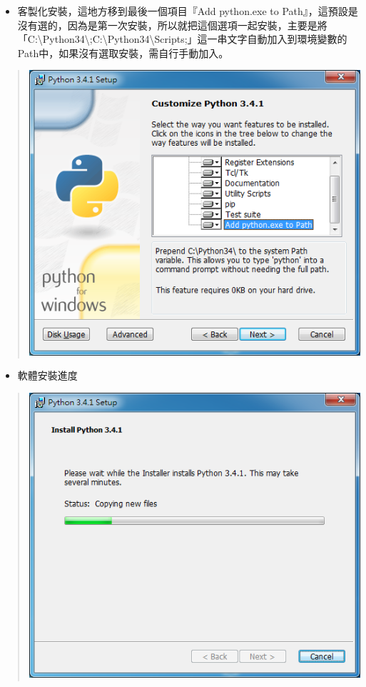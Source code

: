 \documentclass[letterpaper,10pt,english]{sphinxmanual}
\begin{document}
\begin{itemize}
\item {} 
客製化安裝，這地方移到最後一個項目『Add python.exe to Path』，這預設是沒有選的，因為是第一次安裝，所以就把這個選項一起安裝，主要是將「C:\textbackslash{}Python34\textbackslash{};C:\textbackslash{}Python34\textbackslash{}Scripts;」這一串文字自動加入到環境變數的Path中，如果沒有選取安裝，需自行手動加入。

\end{itemize}
\begin{quote}

\includegraphics{Python-Install-003.png}
\end{quote}
\begin{itemize}
\item {} 
軟體安裝進度

\end{itemize}
\begin{quote}

\includegraphics{Python-Install-004.png}
\end{quote}
\end{document}

